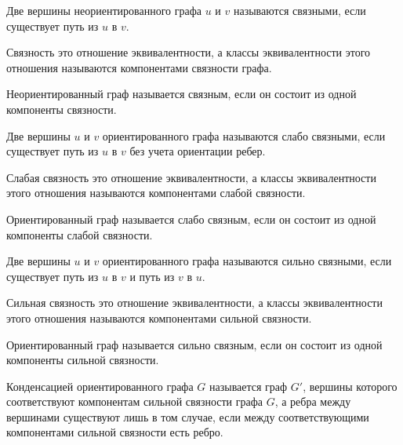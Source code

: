 
\begin{definition}
  Две вершины неориентированного графа \(u\) и \(v\) называются связными, если
  существует путь из \(u\) в \(v\).
\end{definition}

\begin{remark}
  Связность это отношение эквивалентности, а классы эквивалентности этого
  отношения называются компонентами связности графа.
\end{remark}

\begin{definition}
  Неориентированный граф называется связным, если он состоит из одной компоненты
  связности.
\end{definition}

\begin{definition}
  Две вершины \(u\) и \(v\) ориентированного графа называются слабо связными,
  если существует путь из \(u\) в \(v\) без учета ориентации ребер.
\end{definition}

\begin{remark}
  Слабая связность это отношение эквивалентности, а классы эквивалентности этого
  отношения называются компонентами слабой связности.
\end{remark}

\begin{definition}
  Ориентированный граф называется слабо связным, если он состоит из одной
  компоненты слабой связности.
\end{definition}

\begin{definition}
  Две вершины \(u\) и \(v\) ориентированного графа называются сильно связными,
  если существует путь из \(u\) в \(v\) и путь из \(v\) в \(u\).
\end{definition}

\begin{remark}
  Сильная связность это отношение эквивалентности, а классы эквивалентности
  этого отношения называются компонентами сильной связности.
\end{remark}

\begin{definition}
  Ориентированный граф называется сильно связным, если он состоит из одной
  компоненты сильной связности.
\end{definition}

\begin{definition}
  Конденсацией ориентированного графа \(G\) называется граф \(G'\), вершины
  которого соответствуют компонентам сильной связности графа \(G\), а ребра
  между вершинами существуют лишь в том случае, если между соответствующими
  компонентами сильной связности есть ребро.
\end{definition}

